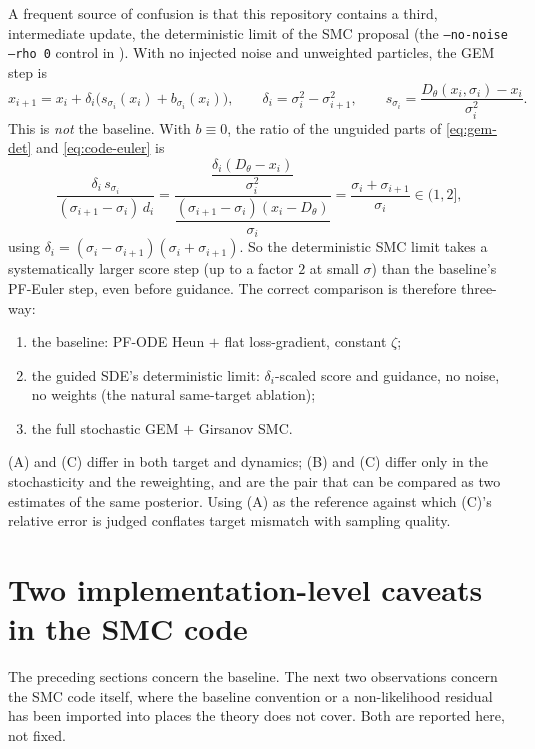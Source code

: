 \documentclass[11pt]{article}
\begin{document}
A frequent source of confusion is that this repository contains a third, intermediate update, the
deterministic limit of the SMC proposal (the \texttt{--no-noise --rho 0} control in
). With no injected noise and unweighted particles, the
GEM step is
\begin{equation}\label{eq:gem-det}
  x_{i+1} = x_i + \delta_i\bigl(s_{\sigma_i}(x_i)+b_{\sigma_i}(x_i)\bigr),
  \qquad
  \delta_i = \sigma_i^2-\sigma_{i+1}^2,
  \qquad
  s_{\sigma_i} = \frac{D_\theta(x_i,\sigma_i)-x_i}{\sigma_i^2}.
\end{equation}
This is \emph{not} the baseline. With $b\equiv0$, the ratio of the unguided parts of
\eqref{eq:gem-det} and \eqref{eq:code-euler} is
\begin{equation}\label{eq:gem-vs-baseline}
  \frac{\delta_i\,s_{\sigma_i}}{(\sigma_{i+1}-\sigma_i)\,d_i}
  = \frac{\dfrac{\delta_i(D_\theta-x_i)}{\sigma_i^2}}
         {\dfrac{(\sigma_{i+1}-\sigma_i)(x_i-D_\theta)}{\sigma_i}}
  = \frac{\sigma_i+\sigma_{i+1}}{\sigma_i}\in(1,2],
\end{equation}
using $\delta_i=(\sigma_i-\sigma_{i+1})(\sigma_i+\sigma_{i+1})$. So the deterministic SMC limit
takes a systematically larger score step (up to a factor $2$ at small $\sigma$) than the baseline's
PF-Euler step, even before guidance. The correct comparison is therefore three-way:
\begin{enumerate}
  \item[(A)] the baseline: PF-ODE Heun $+$ flat loss-gradient, constant $\zeta$;
  \item[(B)] the guided SDE's deterministic limit: $\delta_i$-scaled score and guidance, no noise,
        no weights (the natural same-target ablation);
  \item[(C)] the full stochastic GEM $+$ Girsanov SMC.
\end{enumerate}
(A) and (C) differ in both target and dynamics; (B) and (C) differ only in the stochasticity and the
reweighting, and are the pair that can be compared as two estimates of the same posterior.
Using (A) as the reference against which (C)'s relative error is judged conflates target mismatch
with sampling quality.

\section{Two implementation-level caveats in the SMC code}\label{sec:caveats}

The preceding sections concern the baseline. The next two observations concern the SMC code itself,
where the baseline convention or a non-likelihood residual has been imported into places the theory
does not cover. Both are reported here, not fixed.
\end{document}
